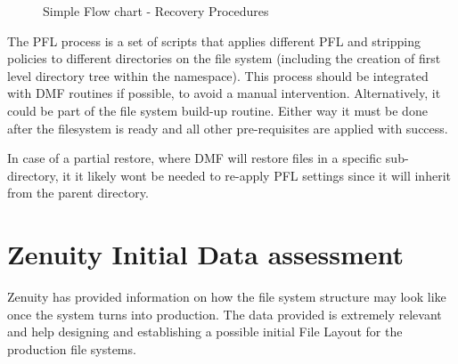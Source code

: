 \documentclass{article}
\begin{document}
\begin{figure}
\begin{center}
\caption{Simple Flow chart - Recovery Procedures}
\end{center}
\end{figure}


The PFL process is a set of scripts that applies different PFL and stripping policies to different directories on the file system (including the creation of first level directory tree within the namespace). This process should be integrated with DMF routines if possible, to avoid a manual intervention. Alternatively, it could be part of the file system build-up routine. Either way it must be done after the filesystem is ready and all other pre-requisites are applied with success.

In case of a partial restore, where DMF will restore files in a specific sub-directory, it it likely wont be needed to re-apply PFL settings since it will inherit from the parent directory. 

\newpage
\section{Zenuity Initial Data assessment}
Zenuity has provided information on how the file system structure may look like once the system turns into production. The data provided is extremely relevant and help designing and establishing a possible initial File Layout for the production file systems.
\end{document}
